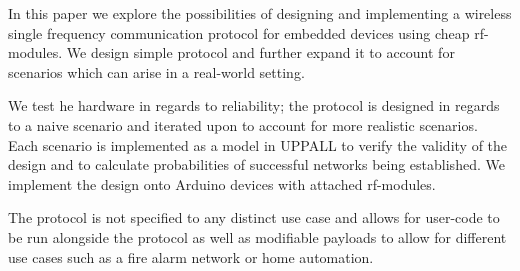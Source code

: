 In this paper we explore the possibilities of designing and implementing a wireless single frequency communication protocol for embedded devices using cheap \acrshort{rf}-modules.
We design simple protocol and further expand it to account for scenarios which can arise in a real-world setting.

\medskip
We test he hardware in regards to reliability; the protocol is designed in regards to a naive scenario and iterated upon to account for more realistic scenarios.
Each scenario is implemented as a model in UPPALL to verify the validity of the design and to calculate probabilities of successful networks being established.
We implement the design onto Arduino devices with attached \acrshort{rf}-modules.

\medskip
The protocol is not specified to any distinct use case and allows for user-code to be run alongside the protocol as well as modifiable payloads to allow for different use cases such as a fire alarm network or home automation. 